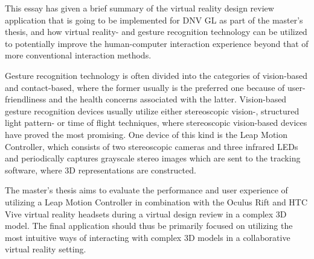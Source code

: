 This essay has given a brief summary of the virtual reality design review application that is going to be implemented for DNV GL as part of the master's thesis, and how virtual reality- and gesture recognition technology can be utilized to potentially improve the human-computer interaction experience beyond that of more conventional interaction methods. 

Gesture recognition technology is often divided into the categories of vision-based and contact-based, where the former usually is the preferred one because of user-friendliness and the health concerns associated with the latter. Vision-based gesture recognition devices usually utilize either stereoscopic vision-, structured light pattern- or time of flight techniques, where stereoscopic vision-based devices have proved the most promising. One device of this kind is the Leap Motion Controller, which consists of two stereoscopic cameras and three infrared LEDs and periodically captures grayscale stereo images which are sent to the tracking software, where 3D representations are constructed. 

The master's thesis aims to evaluate the performance and user experience of utilizing a Leap Motion Controller in combination with the Oculus Rift and HTC Vive virtual reality headsets during a virtual design review in a complex 3D model. The final application should thus be primarily focused on utilizing the most intuitive ways of interacting with complex 3D models in a collaborative virtual reality setting.     	                                     



